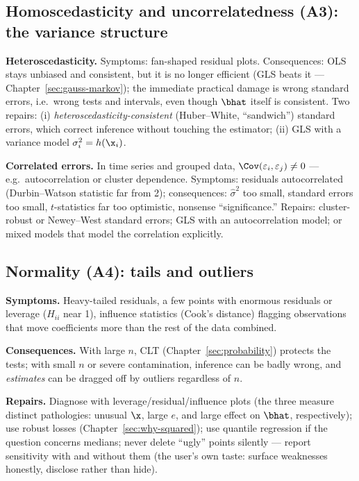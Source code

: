 \subsection{Homoscedasticity and uncorrelatedness (A3): the variance structure}

\textbf{Heteroscedasticity.} Symptoms: fan-shaped residual plots. Consequences: OLS stays unbiased and consistent, but it is no longer efficient (GLS beats it — Chapter~\ref{sec:gauss-markov}); the immediate practical damage is wrong standard errors, i.e.\ wrong tests and intervals, even though $\bhat$ itself is consistent. Two repairs: (i) \emph{heteroscedasticity-consistent} (Huber--White, ``sandwich'') standard errors, which correct inference without touching the estimator; (ii) GLS with a variance model $\sigma_i^2 = h(\x_i)$.

\textbf{Correlated errors.} In time series and grouped data, $\Cov(\varepsilon_i, \varepsilon_j) \neq 0$ — e.g.\ autocorrelation or cluster dependence. Symptoms: residuals autocorrelated (Durbin--Watson statistic far from 2); consequences: $\hat\sigma^2$ too small, standard errors too small, $t$-statistics far too optimistic, nonsense ``significance.'' Repairs: cluster-robust or Newey--West standard errors; GLS with an autocorrelation model; or mixed models that model the correlation explicitly.

\subsection{Normality (A4): tails and outliers}

\textbf{Symptoms.} Heavy-tailed residuals, a few points with enormous residuals or leverage ($H_{ii}$ near 1), influence statistics (Cook's distance) flagging observations that move coefficients more than the rest of the data combined.

\textbf{Consequences.} With large $n$, CLT (Chapter~\ref{sec:probability}) protects the tests; with small $n$ or severe contamination, inference can be badly wrong, and \emph{estimates} can be dragged off by outliers regardless of $n$.

\textbf{Repairs.} Diagnose with leverage/residual/influence plots (the three measure distinct pathologies: unusual $\x$, large $e$, and large effect on $\bhat$, respectively); use robust losses (Chapter~\ref{sec:why-squared}); use quantile regression if the question concerns medians; never delete ``ugly'' points silently — report sensitivity with and without them (the user's own taste: surface weaknesses honestly, disclose rather than hide).

